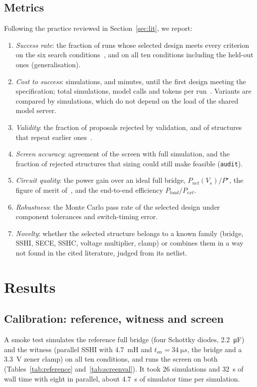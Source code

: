 \documentclass[journal]{IEEEtran}
\begin{document}
\subsection{Metrics}
Following the practice reviewed in Section~\ref{sec:lit}, we report:
\begin{enumerate}
\item \emph{Success rate}: the fraction of runs whose selected design meets every criterion on the six
search conditions~\cite{chang2024lamagic,zhang2024analogxpert}, and on all ten conditions including the
held-out ones (generalisation).
\item \emph{Cost to success}: simulations, and minutes, until the first design meeting the specification;
total simulations, model calls and tokens per run~\cite{koza1997analog,zhao2022drl}. Variants are compared
by simulations, which do not depend on the load of the shared model server.
\item \emph{Validity}: the fraction of proposals rejected by validation, and of structures that repeat
earlier ones~\cite{gao2025analoggenie}.
\item \emph{Screen accuracy}: agreement of the screen with full simulation, and the fraction of rejected
structures that sizing could still make feasible (\texttt{audit}).
\item \emph{Circuit quality}: the power gain over an ideal full bridge, $P_{net}(V_s)/P^\star$, the
figure of merit of~\cite{ramadass2010biasflip,peng2019senseset}, and the end-to-end efficiency
$P_{load}/P_{ext}$.
\item \emph{Robustness}: the Monte Carlo pass rate of the selected design under component tolerances and
switch-timing error.
\item \emph{Novelty}: whether the selected structure belongs to a known family (bridge, SSHI, SECE, SSHC,
voltage multiplier, clamp) or combines them in a way not found in the cited literature, judged from its
netlist.
\end{enumerate}

\section{Results}\label{sec:results}
\subsection{Calibration: reference, witness and screen}\label{sec:pilot}
A smoke test simulates the reference full bridge (four Schottky diodes, \SI{2.2}{\micro F}) and the
witness (parallel SSHI with \SI{4.7}{mH} and $t_{on}=\SI{34}{\micro s}$, the bridge and a \SI{3.3}{V}
zener clamp) on all ten conditions, and runs the screen on both (Tables~\ref{tab:reference}
and~\ref{tab:screenval}). It took 26 simulations and \SI{32}{s} of wall time with eight in parallel,
about \SI{4.7}{s} of simulator time per simulation.
\end{document}

